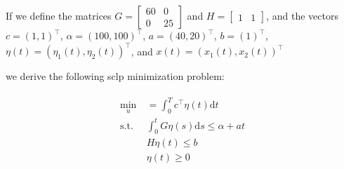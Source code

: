 \documentclass[11pt,a4paper,titlepage]{article}
\theoremstyle{definition}
\theoremstyle{plain}
\begin{document}
{        If we define the matrices
        $
        G =
        \begin{bmatrix}
            60 & 0 \\
            0 & 25
        \end{bmatrix}
        $
        and
        $
        H =
        \begin{bmatrix}
            1 & 1
        \end{bmatrix}
        $,
        and the vectors
        $
        c = (1,1)^\top
        $,
        $
        \alpha = (100,100)^\top
        $,
        $
        a = (40,20)^\top
        $,
        $
        b = (1)^\top
        $,
        $
        \eta(t) = (\eta_1(t), \eta_2(t))^\top
        $,
        and
        $
        x(t) = (x_1(t), x_2(t))^\top
        $

        we derive the following \gls{sclp} minimization problem:

        \begin{align}
            \begin{split}
                \min\limits_{u}
                &~ = \int_0^T c^\top \eta(t) \mathrm{d}t \\
                \text{s.t.}
                &~ \int_0^t G \eta(s) \mathrm{d}s \leq \alpha + a t \\
                &~ H \eta(t) \leq b \\
                &~ \eta(t) \geq 0
            \end{split}
        \end{align}

}
\end{document}
